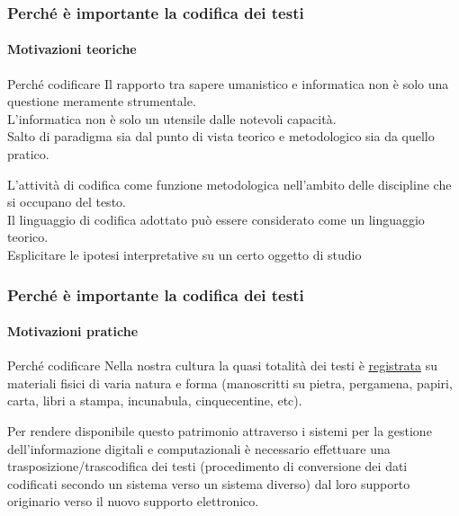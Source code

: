 \begin{frame}
    \frametitle{Perché è importante la codifica dei testi}
    \framesubtitle{Motivazioni teoriche}
    \addtocounter{nframe}{1}
    
    \begin{block}{Perché codificare}
        Il rapporto tra sapere umanistico e informatica non è solo una questione meramente strumentale. 
        \\ L'informatica non è solo un utensile dalle notevoli capacità.
        \\ Salto di paradigma sia dal punto di vista teorico e metodologico sia da quello pratico.

        L'attività di codifica come funzione metodologica nell'ambito delle discipline che si occupano del testo.
        \\ Il linguaggio di codifica adottato può essere considerato come un linguaggio teorico.
        \\ Esplicitare le ipotesi interpretative su un certo oggetto di studio
    \end{block}

\end{frame}

\begin{frame}
    \frametitle{Perché è importante la codifica dei testi}
    \framesubtitle{Motivazioni pratiche}
    \addtocounter{nframe}{1}
    
    \begin{block}{Perché codificare}
        Nella nostra cultura la quasi totalità dei testi è \underline{registrata} su materiali fisici di varia natura e forma (manoscritti su pietra, pergamena, papiri, carta, libri a stampa, incunabula, cinquecentine, etc).

        Per rendere disponibile questo patrimonio attraverso i sistemi per la gestione dell'informazione digitali e computazionali è necessario effettuare una trasposizione/trascodifica dei testi (procedimento di conversione dei dati codificati secondo un sistema verso un sistema diverso) dal loro supporto originario verso il nuovo supporto elettronico.
    \end{block}

\end{frame}

